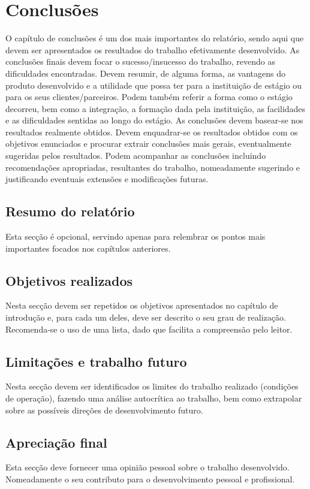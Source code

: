 \chapter{Conclusões}
\label{cap:6}
O capítulo de conclusões é um dos mais importantes do relatório, sendo aqui que devem ser apresentados os resultados do trabalho efetivamente desenvolvido. 
As conclusões finais devem focar o sucesso/insucesso do trabalho, revendo as dificuldades encontradas. Devem resumir, de alguma forma, as vantagens do produto desenvolvido e a utilidade que possa ter para a instituição de estágio ou para os seus clientes/parceiros. Podem também referir a forma como o estágio decorreu, bem como a integração, a formação dada pela instituição, as facilidades e as dificuldades sentidas ao longo do estágio.
As conclusões devem basear-se nos resultados realmente obtidos. Devem enquadrar-se os resultados obtidos com os objetivos enunciados e procurar extrair conclusões mais gerais, eventualmente sugeridas pelos resultados. Podem acompanhar as conclusões incluindo recomendações apropriadas, resultantes do trabalho, nomeadamente sugerindo e justificando eventuais extensões e modificações futuras.


\section{Resumo do relatório}

Esta secção é opcional, servindo apenas para relembrar os pontos mais importantes focados nos capítulos anteriores.


\section{Objetivos realizados}

Nesta secção devem ser repetidos os objetivos apresentados no capítulo de introdução e, para cada um deles, deve ser descrito o seu grau de realização. Recomenda-se o uso de uma lista, dado que facilita a compreensão pelo leitor.

\section{Limitações e trabalho futuro}

Nesta secção devem ser identificados os limites do trabalho realizado (condições de operação), fazendo uma análise autocrítica ao trabalho, bem como extrapolar sobre as possíveis direções de desenvolvimento futuro.

\section{Apreciação final}

Esta secção deve fornecer uma opinião pessoal sobre o trabalho desenvolvido. Nomeadamente o seu contributo para o desenvolvimento pessoal e profissional.